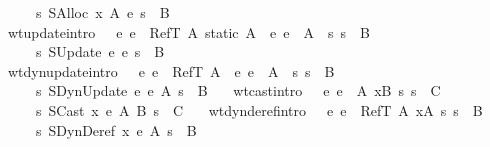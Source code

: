 \begin{isabellebody}
\ \ \ \ \ {\isasymGamma}\ {\isasymturnstile}\isactrlisub s\ SAlloc\ x\ A\ e\ s\ {\isacharcolon}\ B{\isachardoublequoteclose}\ {\isacharbar}\isanewline
\ \ wt{\isacharunderscore}update{\isacharbrackleft}intro{\isacharbang}{\isacharbrackright}{\isacharcolon}\ {\isachardoublequoteopen}{\isasymlbrakk}\ {\isasymGamma}\ {\isasymturnstile}\isactrlisub e\ e\ {\isacharcolon}\ RefT\ A{\isacharsemicolon}\ static\ A{\isacharsemicolon}\ {\isasymGamma}\ {\isasymturnstile}\isactrlisub e\ e{\isacharprime}\ {\isacharcolon}\ A{\isacharsemicolon}\ {\isasymGamma}\ {\isasymturnstile}\isactrlisub s\ s\ {\isacharcolon}\ B\ {\isasymrbrakk}\ {\isasymLongrightarrow}\isanewline
\ \ \ \ \ {\isasymGamma}\ {\isasymturnstile}\isactrlisub s\ SUpdate\ e\ e{\isacharprime}\ s\ {\isacharcolon}\ B{\isachardoublequoteclose}\ {\isacharbar}\isanewline
\ \ wt{\isacharunderscore}dynupdate{\isacharbrackleft}intro{\isacharbang}{\isacharbrackright}{\isacharcolon}\ {\isachardoublequoteopen}{\isasymlbrakk}\ {\isasymGamma}\ {\isasymturnstile}\isactrlisub e\ e\ {\isacharcolon}\ RefT\ A{\isacharsemicolon}\ {\isasymGamma}\ {\isasymturnstile}\isactrlisub e\ e{\isacharprime}\ {\isacharcolon}\ A{\isacharsemicolon}\ {\isasymGamma}\ {\isasymturnstile}\isactrlisub s\ s\ {\isacharcolon}\ B\ {\isasymrbrakk}\ {\isasymLongrightarrow}\isanewline
\ \ \ \ \ {\isasymGamma}\ {\isasymturnstile}\isactrlisub s\ SDynUpdate\ e\ e{\isacharprime}\ A\ s\ {\isacharcolon}\ B{\isachardoublequoteclose}\ {\isacharbar}\isanewline
\ \ wt{\isacharunderscore}cast{\isacharbrackleft}intro{\isacharbang}{\isacharbrackright}{\isacharcolon}\ {\isachardoublequoteopen}{\isasymlbrakk}\ {\isasymGamma}\ {\isasymturnstile}\isactrlisub e\ e\ {\isacharcolon}\ A{\isacharsemicolon}\ {\isacharparenleft}x{\isacharcomma}B{\isacharparenright}{\isacharhash}{\isasymGamma}\ {\isasymturnstile}\isactrlisub s\ s\ {\isacharcolon}\ C\ {\isasymrbrakk}\ {\isasymLongrightarrow}\isanewline
\ \ \ \ \ {\isasymGamma}\ {\isasymturnstile}\isactrlisub s\ SCast\ x\ e\ A\ B\ s\ {\isacharcolon}\ C{\isachardoublequoteclose}\ {\isacharbar}\isanewline
\ \ wt{\isacharunderscore}dynderef{\isacharbrackleft}intro{\isacharbang}{\isacharbrackright}{\isacharcolon}\ {\isachardoublequoteopen}{\isasymlbrakk}\ {\isasymGamma}\ {\isasymturnstile}\isactrlisub e\ e\ {\isacharcolon}\ RefT\ A{\isacharsemicolon}\ {\isacharparenleft}x{\isacharcomma}A{\isacharparenright}{\isacharhash}{\isasymGamma}\ {\isasymturnstile}\isactrlisub s\ s\ {\isacharcolon}\ B\ {\isasymrbrakk}\ {\isasymLongrightarrow}\isanewline
\ \ \ \ \ {\isasymGamma}\ {\isasymturnstile}\isactrlisub s\ SDynDeref\ x\ e\ A\ s\ {\isacharcolon}\ B{\isachardoublequoteclose}\isanewline

\end{isabellebody}
